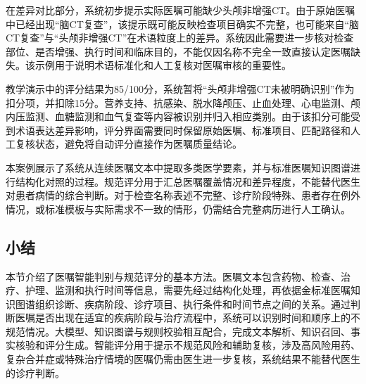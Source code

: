 在差异对比部分，系统初步提示实际医嘱可能缺少头颅非增强CT。由于原始医嘱中已经出现“脑CT复查”，该提示既可能反映检查项目确实不完整，也可能来自“脑CT复查”与“头颅非增强CT”在术语粒度上的差异。系统因此需要进一步核对检查部位、是否增强、执行时间和临床目的，不能仅因名称不完全一致直接认定医嘱缺失。该示例用于说明术语标准化和人工复核对医嘱审核的重要性。

教学演示中的评分结果为85/100分，系统暂将“头颅非增强CT未被明确识别”作为扣分项，并扣除15分。营养支持、抗感染、脱水降颅压、止血处理、心电监测、颅内压监测、血糖监测和血气复查等内容被识别并归入相应类别。由于该扣分可能受到术语表达差异影响，评分界面需要同时保留原始医嘱、标准项目、匹配路径和人工复核状态，避免将自动评分直接作为医嘱质量结论。

本案例展示了系统从连续医嘱文本中提取多类医学要素，并与标准医嘱知识图谱进行结构化对照的过程。规范评分用于汇总医嘱覆盖情况和差异程度，不能替代医生对患者病情的综合判断。对于检查名称表述不完整、诊疗阶段特殊、患者存在例外情况，或标准模板与实际需求不一致的情形，仍需结合完整病历进行人工确认。


\par
\noindent\begin{minipage}{\textwidth}
\centering
{}
\begingroup
\renewcommand{\thefigure}{10.4-3}
\label{fig:ch10_04_3}
\addtocounter{figure}{-1}
\endgroup
\end{minipage}
\par



\subsection*{小结}

本节介绍了医嘱智能判别与规范评分的基本方法。医嘱文本包含药物、检查、治疗、护理、监测和执行时间等信息，需要先经过结构化处理，再依据金标准医嘱知识图谱组织诊断、疾病阶段、诊疗项目、执行条件和时间节点之间的关系。通过判断医嘱是否出现在适宜的疾病阶段与治疗流程中，系统可以识别时间和顺序上的不规范情况。大模型、知识图谱与规则校验相互配合，完成文本解析、知识召回、事实核验和评分生成。智能评分用于提示不规范风险和辅助复核，涉及高风险用药、复杂合并症或特殊治疗情境的医嘱仍需由医生进一步复核，系统结果不能替代医生的诊疗判断。

\bigskip
